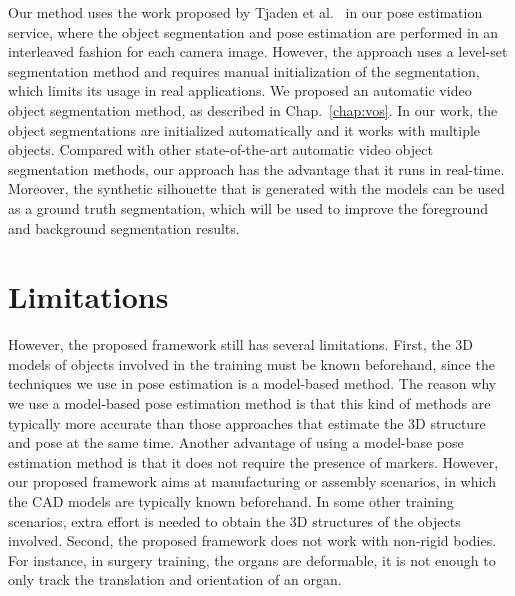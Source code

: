 Our method uses the work proposed by Tjaden et al.~\cite{tjaden2016} in our pose estimation service, where the object segmentation and pose estimation are performed in an interleaved fashion for each camera image.
However, the approach uses a level-set segmentation method and requires manual initialization of the segmentation, which limits its usage in real applications.
We proposed an automatic video object segmentation method, as described in Chap.~\ref{chap:vos}. In our work, the object segmentations are initialized automatically and it works with multiple objects.
Compared with other state-of-the-art automatic video object segmentation methods, our approach has the advantage that it runs in real-time.
Moreover, the synthetic silhouette that is generated with the models can be used as a ground truth segmentation, which will be used to improve the foreground and background segmentation results.

\section{Limitations}

However, the proposed framework still has several limitations.
First, the 3D models of objects involved in the training must be known beforehand, since the techniques we use in pose estimation is a model-based method.
The reason why we use a model-based pose estimation method is that this kind of methods are typically more accurate than those approaches that estimate the 3D structure and pose at the same time. Another advantage of using a model-base pose estimation method is that it does not require the presence of markers.
However, our proposed framework aims at manufacturing or assembly scenarios, in which the CAD models are typically known beforehand.
In some other training scenarios, extra effort is needed to obtain the 3D structures of the objects involved.
Second, the proposed framework does not work with non-rigid bodies.
For instance, in surgery training, the organs are deformable, it is not enough to only track the translation and orientation of an organ.
